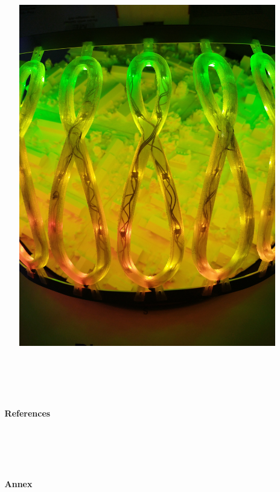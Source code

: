 \documentclass[a4paper,9pt]{article}
\begin{document}
    \begin{minipage}{0.48\linewidth}
         \begin{figure}[H]
        \centering
        \includegraphics[width=.9\linewidth]{Images/e4.jpg}
    
    \end{figure}
\end{minipage}
\newpage
\section*{$\;$}
\noindent\hrulefill $\;\;\;\;${\Large \textbf{References}}$\;\;\;$ \noindent\hrulefill
{}
\AtNextBibliography{\small}
\printbibliography[title=$\;$]
\newpage
\section*{$\;$}
\noindent\hrulefill $\;\;\;\;${\Large \textbf{Annex}}$\;\;\;$ \noindent\hrulefill\\[1.6cm]
{}
\label{Annex}
\end{document}
